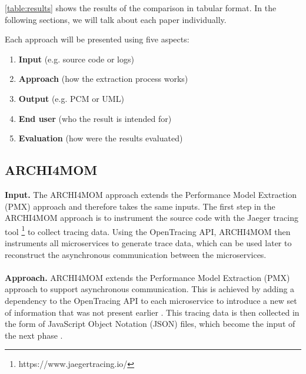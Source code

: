 \autoref{table:results} shows the results of the comparison in tabular format.
In the following sections, we will talk about each paper individually.

Each approach will be presented using five aspects:
\begin{enumerate}
	\item \textbf{Input} (e.g. source code or logs)
	\item \textbf{Approach} (how the extraction process works)
	\item \textbf{Output} (e.g. PCM or UML)
	\item \textbf{End user} (who the result is intended for)
	\item \textbf{Evaluation} (how were the results evaluated)
\end{enumerate}

\subsection{ARCHI4MOM}
\label{sec:Results:ARCHI4MOM}
\textbf{Input.}
The ARCHI4MOM approach extends the Performance Model Extraction (PMX) approach \cite{Walter2017PMX,Singh2022ARCHI4MOM} and therefore takes the same inputs.
The first step in the ARCHI4MOM approach is to instrument the source code with the Jaeger tracing tool \footnote{https://www.jaegertracing.io/} to collect tracing data.
Using the OpenTracing API, ARCHI4MOM then instruments all microservices to generate trace data, which can be used later to reconstruct the asynchronous communication between the microservices. \cite{Singh2022ARCHI4MOM} %
\\ \\
\textbf{Approach.}
ARCHI4MOM extends the Performance Model Extraction (PMX) approach \cite{Walter2017PMX,Singh2022ARCHI4MOM} to support asynchronous communication.
This is achieved by adding a dependency to the OpenTracing API to each microservice to introduce a new set of information that was not present earlier \cite{Singh2022ARCHI4MOM}.
This tracing data is then collected in the form of JavaScript Object Notation (JSON) files, which become the input of the next phase \cite{Singh2022ARCHI4MOM}.

